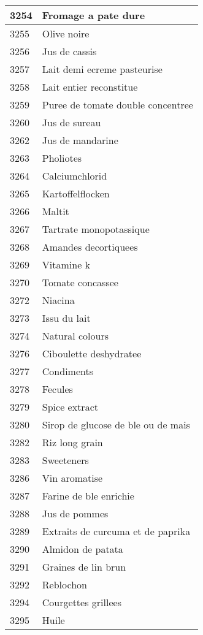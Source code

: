 \begin{longtable}{|l|l|}
3254 & Fromage a pate dure \\ \hline 
3255 & Olive noire \\ \hline 
3256 & Jus de cassis \\ \hline 
3257 & Lait demi ecreme pasteurise \\ \hline 
3258 & Lait entier reconstitue \\ \hline 
3259 & Puree de tomate double concentree \\ \hline 
3260 & Jus de sureau \\ \hline 
3262 & Jus de mandarine \\ \hline 
3263 & Pholiotes \\ \hline 
3264 & Calciumchlorid \\ \hline 
3265 & Kartoffelflocken \\ \hline 
3266 & Maltit \\ \hline 
3267 & Tartrate monopotassique \\ \hline 
3268 & Amandes decortiquees \\ \hline 
3269 & Vitamine k \\ \hline 
3270 & Tomate concassee \\ \hline 
3272 & Niacina \\ \hline 
3273 & Issu du lait \\ \hline 
3274 & Natural colours \\ \hline 
3276 & Ciboulette deshydratee \\ \hline 
3277 & Condiments \\ \hline 
3278 & Fecules \\ \hline 
3279 & Spice extract \\ \hline 
3280 & Sirop de glucose de ble ou de mais \\ \hline 
3282 & Riz long grain \\ \hline 
3283 & Sweeteners \\ \hline 
3286 & Vin aromatise \\ \hline 
3287 & Farine de ble enrichie \\ \hline 
3288 & Jus de pommes \\ \hline 
3289 & Extraits de curcuma et de paprika \\ \hline 
3290 & Almidon de patata \\ \hline 
3291 & Graines de lin brun \\ \hline 
3292 & Reblochon \\ \hline 
3294 & Courgettes grillees \\ \hline 
3295 & Huile \\ \hline 

\end{longtable}
